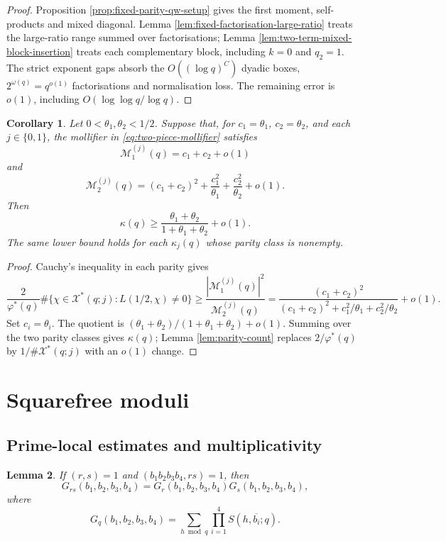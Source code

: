 \documentclass[12pt, a4paper]{amsart}
\numberwithin{equation}{section}
\renewcommand{\ge}{\geqslant}
\theoremstyle{plain}
\newtheorem{lem}{Lemma}[section]
\newtheorem{cor}[lem]{Corollary}
\begin{document}
\begin{proof}
Proposition \ref{prop:fixed-parity-qw-setup} gives the first moment, self-products and mixed diagonal. Lemma \ref{lem:fixed-factorisation-large-ratio} treats the large-ratio range summed over factorisations; Lemma \ref{lem:two-term-mixed-block-insertion} treats each complementary block, including $k=0$ and $q_2=1$. The strict exponent gaps absorb the $O((\log q)^C)$ dyadic boxes, $2^{\omega(q)}=q^{o(1)}$ factorisations and normalisation loss. The remaining error is $o(1)$, including $O(\log\log q/\log q)$.
\end{proof}

\begin{cor}\label{cor:qw-nv}
Let $0<\theta_1,\theta_2<1/2$. Suppose that, for $c_1=\theta_1$, $c_2=\theta_2$, and each $j\in\{0,1\}$, the mollifier in \eqref{eq:two-piece-mollifier} satisfies
$$
\mathcal M_1^{(j)}(q)=c_1+c_2+o(1)
$$
and
$$
\mathcal M_2^{(j)}(q)
=(c_1+c_2)^2+\frac{c_1^2}{\theta_1}
+\frac{c_2^2}{\theta_2}+o(1).
$$
Then
$$
\kappa(q)\ge
\frac{\theta_1+\theta_2}{1+\theta_1+\theta_2}+o(1).
$$
The same lower bound holds for each $\kappa_j(q)$ whose parity class is nonempty.
\end{cor}

\begin{proof}
Cauchy's inequality in each parity gives
$$
\frac{2}{\varphi^*(q)}
\#\{\chi\in\mathcal X^*(q;j):L(1/2,\chi)\ne0\}
\ge
\frac{|\mathcal M_1^{(j)}(q)|^2}{\mathcal M_2^{(j)}(q)}
=
\frac{(c_1+c_2)^2}{(c_1+c_2)^2+c_1^2/\theta_1+c_2^2/\theta_2}+o(1).
$$
Set $c_i=\theta_i$. The quotient is $(\theta_1+\theta_2)/(1+\theta_1+\theta_2)+o(1)$. Summing over the two parity classes gives $\kappa(q)$; Lemma \ref{lem:parity-count} replaces $2/\varphi^*(q)$ by $1/\#\mathcal X^*(q;j)$ with an $o(1)$ change.
\end{proof}

\section{Squarefree moduli}\label{sec:squarefree}

\subsection{Prime-local estimates and multiplicativity}

\begin{lem}\label{lem:kloo-mult}
If $(r,s)=1$ and $(b_1b_2b_3b_4,rs)=1$, then
$$
G_{rs}(b_1,b_2,b_3,b_4)=G_r(b_1,b_2,b_3,b_4)G_s(b_1,b_2,b_3,b_4),
$$
where
$$
G_q(b_1,b_2,b_3,b_4)=
\sum_{h\bmod q}\prod_{i=1}^4S(h,\overline{b_i};q).
$$
\end{lem}
\end{document}
